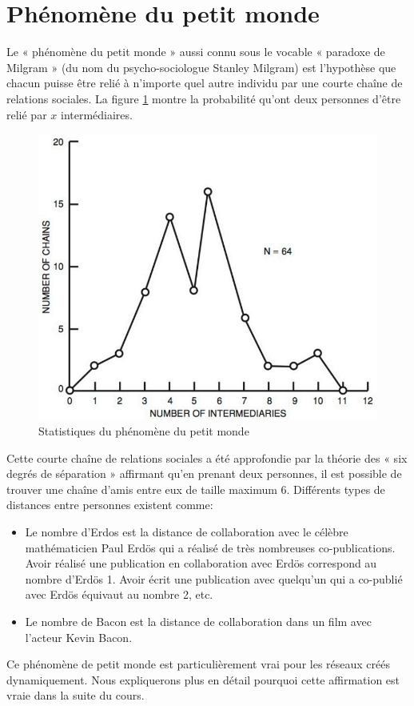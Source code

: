 \section{Phénomène du petit monde}
Le « phénomène du petit monde » aussi connu sous le vocable « paradoxe de Milgram » (du nom du psycho-sociologue Stanley Milgram) est l'hypothèse que chacun puisse être relié à n'importe quel autre individu par une courte chaîne de relations sociales. La figure \ref{petit_monde} montre la probabilité qu'ont deux personnes d'être relié par $x$ intermédiaires. 
	\begin{figure}
	\center
	\includegraphics[scale=1]{images/18_fig.png}
	\caption{\label{petit_monde} Statistiques du phénomène du petit monde}
	\end{figure}
Cette  courte chaîne de relations sociales a été approfondie par la théorie des « six degrés de séparation » affirmant qu'en prenant deux personnes, il est possible de trouver une chaîne d'amis entre eux de taille maximum 6.
Différents types de distances entre personnes existent comme:
	\begin{itemize}
	\item Le nombre d'Erdos est la distance de collaboration avec le célèbre mathématicien Paul Erdös qui a réalisé de très nombreuses co-publications. Avoir réalisé une publication en collaboration avec Erdös correspond au nombre d'Erdös 1. Avoir écrit une publication avec quelqu'un qui a co-publié avec Erdös équivaut au nombre 2, etc.
	\item Le nombre de Bacon est la distance de collaboration dans un film avec l'acteur Kevin Bacon.
	\end{itemize}
Ce phénomène de petit monde est particulièrement vrai pour les réseaux créés dynamiquement. Nous expliquerons plus en détail pourquoi cette affirmation est vraie dans la suite du cours.

